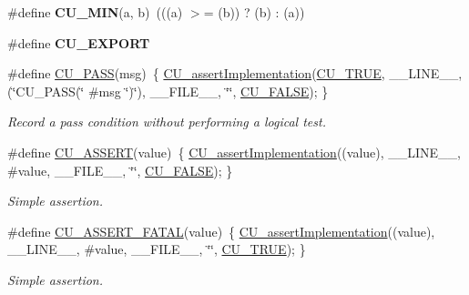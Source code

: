 \begin{DoxyCompactItemize}
\item 
\hypertarget{group__Framework_ga7fb875e694cd5ce7de6c641ed04ebd78}{\#define {\bfseries C\-U\-\_\-\-M\-I\-N}(a, b)~(((a) $>$= (b)) ? (b) \-: (a))}\label{group__Framework_ga7fb875e694cd5ce7de6c641ed04ebd78}

\item 
\hypertarget{group__Framework_ga22e538403fdee24be3388ab473fe64d5}{\#define {\bfseries C\-U\-\_\-\-E\-X\-P\-O\-R\-T}}\label{group__Framework_ga22e538403fdee24be3388ab473fe64d5}

\item 
\#define \hyperlink{group__Framework_ga2366d0e38023a3c89683efee6ebb5696}{C\-U\-\_\-\-P\-A\-S\-S}(msg)~\{ \hyperlink{group__Framework_ga31a858e8b496b2af992b63902064c5fa}{C\-U\-\_\-assert\-Implementation}(\hyperlink{group__Framework_ga99641394bc766ca9c4a295e942fed1ef}{C\-U\-\_\-\-T\-R\-U\-E}, \-\_\-\-\_\-\-L\-I\-N\-E\-\_\-\-\_\-, (\char`\"{}C\-U\-\_\-\-P\-A\-S\-S(\char`\"{} \#msg \char`\"{})\char`\"{}), \-\_\-\-\_\-\-F\-I\-L\-E\-\_\-\-\_\-, \char`\"{}\char`\"{}, \hyperlink{group__Framework_ga7453214541b156ef868681eaafe60860}{C\-U\-\_\-\-F\-A\-L\-S\-E}); \}
\begin{DoxyCompactList}\small\item\em Record a pass condition without performing a logical test. \end{DoxyCompactList}\item 
\#define \hyperlink{group__Framework_ga6e7994f2558c2acf0896cab24f9d9922}{C\-U\-\_\-\-A\-S\-S\-E\-R\-T}(value)~\{ \hyperlink{group__Framework_ga31a858e8b496b2af992b63902064c5fa}{C\-U\-\_\-assert\-Implementation}((value), \-\_\-\-\_\-\-L\-I\-N\-E\-\_\-\-\_\-, \#value, \-\_\-\-\_\-\-F\-I\-L\-E\-\_\-\-\_\-, \char`\"{}\char`\"{}, \hyperlink{group__Framework_ga7453214541b156ef868681eaafe60860}{C\-U\-\_\-\-F\-A\-L\-S\-E}); \}
\begin{DoxyCompactList}\small\item\em Simple assertion. \end{DoxyCompactList}\item 
\#define \hyperlink{group__Framework_ga09431caea46ba334835083160f1e758b}{C\-U\-\_\-\-A\-S\-S\-E\-R\-T\-\_\-\-F\-A\-T\-A\-L}(value)~\{ \hyperlink{group__Framework_ga31a858e8b496b2af992b63902064c5fa}{C\-U\-\_\-assert\-Implementation}((value), \-\_\-\-\_\-\-L\-I\-N\-E\-\_\-\-\_\-, \#value, \-\_\-\-\_\-\-F\-I\-L\-E\-\_\-\-\_\-, \char`\"{}\char`\"{}, \hyperlink{group__Framework_ga99641394bc766ca9c4a295e942fed1ef}{C\-U\-\_\-\-T\-R\-U\-E}); \}
\begin{DoxyCompactList}\small\item\em Simple assertion. \end{DoxyCompactList}\item 

\end{DoxyCompactItemize}
